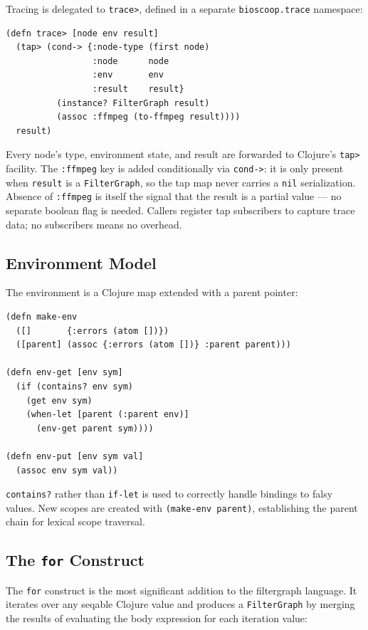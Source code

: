 \documentclass[conference]{IEEEtran}
\begin{document}
Tracing is delegated to \texttt{trace>}, defined in a separate \texttt{bioscoop.trace} namespace:

\begin{lstlisting}[caption={The trace> helper}]
(defn trace> [node env result]
  (tap> (cond-> {:node-type (first node)
                 :node      node
                 :env       env
                 :result    result}
          (instance? FilterGraph result)
          (assoc :ffmpeg (to-ffmpeg result))))
  result)
\end{lstlisting}

Every node's type, environment state, and result are forwarded to Clojure's \texttt{tap>} facility. The \texttt{:ffmpeg} key is added conditionally via \texttt{cond->}: it is only present when \texttt{result} is a \texttt{FilterGraph}, so the tap map never carries a \texttt{nil} serialization. Absence of \texttt{:ffmpeg} is itself the signal that the result is a partial value --- no separate boolean flag is needed. Callers register tap subscribers to capture trace data; no subscribers means no overhead.

\subsection{Environment Model}

The environment is a Clojure map extended with a parent pointer:

\begin{lstlisting}[caption={Environment operations}]
(defn make-env
  ([]       {:errors (atom [])})
  ([parent] (assoc {:errors (atom [])} :parent parent)))

(defn env-get [env sym]
  (if (contains? env sym)
    (get env sym)
    (when-let [parent (:parent env)]
      (env-get parent sym))))

(defn env-put [env sym val]
  (assoc env sym val))
\end{lstlisting}

\texttt{contains?} rather than \texttt{if-let} is used to correctly handle bindings to falsy values. New scopes are created with \texttt{(make-env parent)}, establishing the parent chain for lexical scope traversal.

\subsection{The \texttt{for} Construct}

The \texttt{for} construct is the most significant addition to the filtergraph language. It iterates over any seqable Clojure value and produces a \texttt{FilterGraph} by merging the results of evaluating the body expression for each iteration value:
\end{document}
